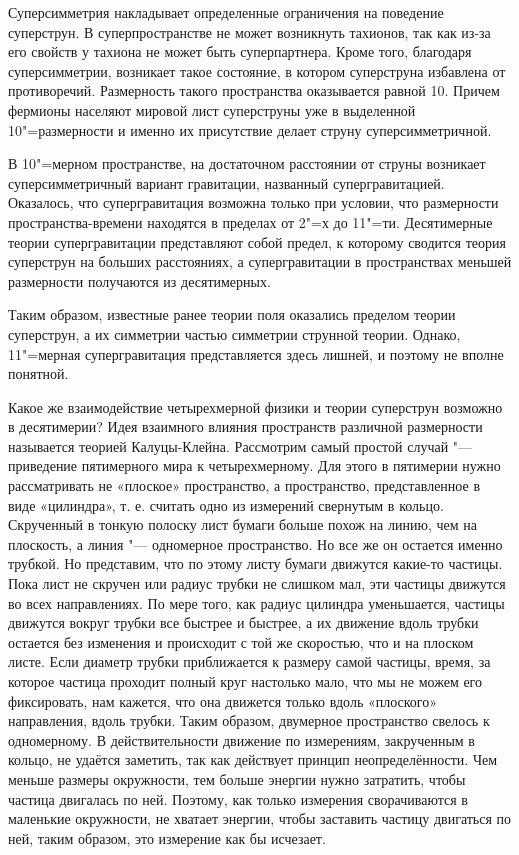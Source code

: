 Суперсимметрия накладывает определенные ограничения на поведение суперструн.
В суперпространстве не может возникнуть тахионов,
так как из-за его свойств у тахиона не может быть суперпартнера.
Кроме того, благодаря суперсимметрии,  возникает такое состояние,
в котором суперструна избавлена от противоречий.
Размерность такого пространства оказывается равной 10.
Причем фермионы населяют мировой лист суперструны уже
в выделенной 10"=размерности и именно их присутствие делает струну суперсимметричной. 

В 10"=мерном пространстве, на достаточном расстоянии от струны возникает
суперсимметричный вариант гравитации, названный супергравитацией.
Оказалось, что супергравитация возможна только при условии,
что размерности пространства-времени находятся в пределах от 2"=х до 11"=ти.
Десятимерные теории супергравитации представляют собой предел,
к которому сводится теория суперструн на больших расстояниях,
а супергравитации в пространствах меньшей размерности получаются из десятимерных. 

Таким образом, известные ранее теории поля оказались пределом теории суперструн,
а их симметрии частью симметрии струнной теории.
Однако, 11"=мерная супергравитация представляется здесь лишней,
и поэтому не вполне понятной.

Какое же взаимодействие четырехмерной физики и теории суперструн возможно в десятимерии?
Идея взаимного влияния пространств различной размерности называется теорией Калуцы-Клейна.
Рассмотрим самый простой случай "--- приведение пятимерного мира к четырехмерному.
Для этого в пятимерии нужно рассматривать не «плоское» пространство,
а пространство, представленное в виде «цилиндра»,
т. е. считать одно из измерений свернутым в кольцо.
Скрученный в тонкую полоску лист бумаги больше похож на линию, чем на плоскость,
а линия "--- одномерное пространство.
Но все же он остается именно трубкой.
Но представим, что по этому листу бумаги движутся какие-то частицы.
Пока лист не скручен или радиус трубки не слишком мал,
эти частицы движутся во всех направлениях.
По мере того, как радиус цилиндра уменьшается,
частицы движутся вокруг трубки все быстрее и быстрее,
а их движение вдоль трубки остается без изменения и происходит с той же скоростью,
что и на плоском листе.
Если диаметр трубки приближается к размеру самой частицы, время,
за которое частица проходит полный круг настолько мало, что мы не можем его фиксировать,
нам кажется, что она движется только вдоль «плоского» направления, вдоль трубки.
Таким образом, двумерное пространство свелось к одномерному.
В действительности движение по измерениям, закрученным в кольцо,
не удаётся заметить, так как действует принцип неопределённости.
Чем меньше размеры окружности, тем больше энергии нужно затратить, чтобы частица двигалась по ней.
Поэтому, как только измерения сворачиваются в маленькие окружности, не хватает энергии,
чтобы заставить частицу двигаться по ней, таким образом, это измерение как бы исчезает. 

